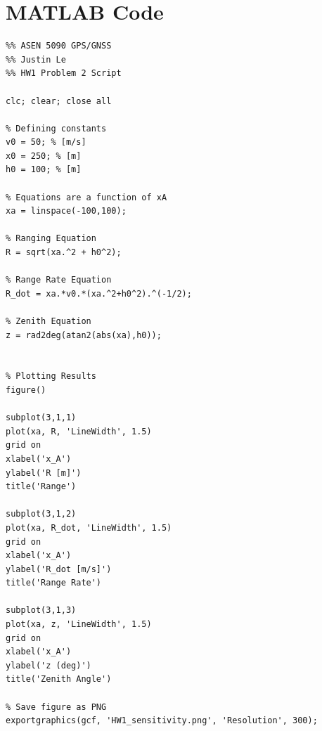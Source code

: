 \documentclass[11pt]{article}
\begin{document}
\section*{MATLAB Code}
\begin{verbatim}
%% ASEN 5090 GPS/GNSS
%% Justin Le
%% HW1 Problem 2 Script

clc; clear; close all

% Defining constants
v0 = 50; % [m/s]
x0 = 250; % [m]
h0 = 100; % [m]

% Equations are a function of xA
xa = linspace(-100,100);

% Ranging Equation
R = sqrt(xa.^2 + h0^2);

% Range Rate Equation
R_dot = xa.*v0.*(xa.^2+h0^2).^(-1/2);

% Zenith Equation
z = rad2deg(atan2(abs(xa),h0));


% Plotting Results
figure()

subplot(3,1,1)
plot(xa, R, 'LineWidth', 1.5)
grid on
xlabel('x_A')
ylabel('R [m]')
title('Range')

subplot(3,1,2)
plot(xa, R_dot, 'LineWidth', 1.5)
grid on
xlabel('x_A')
ylabel('R_dot [m/s]')
title('Range Rate')

subplot(3,1,3)
plot(xa, z, 'LineWidth', 1.5)
grid on
xlabel('x_A')
ylabel('z (deg)')
title('Zenith Angle')

% Save figure as PNG
exportgraphics(gcf, 'HW1_sensitivity.png', 'Resolution', 300);

\end{verbatim}

\newpage
\end{document}
